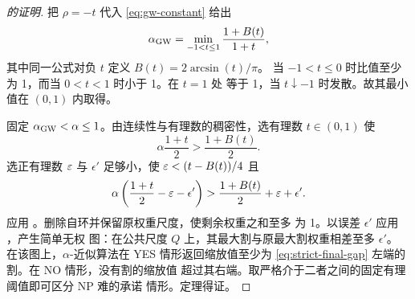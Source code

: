 \begin{proof}[ 的证明]
把 $\rho=-t$ 代入 \eqref{eq:gw-constant} 给出
\begin{equation}\label{eq:gw-ratio}
 \alpha_{\mathrm{GW}}=\min_{-1<t\le1}\frac{1+B(t)}{1+t},
\end{equation}
其中同一公式对负 $t$ 定义 $B(t)=2\arcsin(t)/\pi$。
当 $-1<t\le0$ 时比值至少为 1，而当 $0<t<1$ 时小于 1。在 $t=1$ 处
等于 1，当 $t\downarrow-1$ 时发散。故其最小值在 $(0,1)$ 内取得。

固定 $\alpha_{\mathrm{GW}}<\alpha\le1$。由连续性与有理数的稠密性，选有理数
$t\in(0,1)$ 使
\[
 \alpha\frac{1+t}{2}>\frac{1+B(t)}{2}.
\]
选正有理数 $\varepsilon$ 与 $\epsilon'$ 足够小，使 $\varepsilon<(t-B(t))/4$ 且
\begin{equation}\label{eq:strict-final-gap}
 \alpha\left(\frac{1+t}{2}-\varepsilon-\epsilon'\right)
 >\frac{1+B(t)}{2}+\varepsilon+\epsilon'.
\end{equation}
应用 。删除自环并保留原权重尺度，使剩余权重之和至多
为 1。以误差 $\epsilon'$ 应用 ，产生简单无权
图：在公共尺度 $Q$ 上，其最大割与原最大割权重相差至多 $\epsilon'$。
在该图上，$\alpha$-近似算法在 YES 情形返回缩放值至少为
\eqref{eq:strict-final-gap} 左端的割。在 NO 情形，没有割的缩放值
超过其右端。取严格介于二者之间的固定有理阈值即可区分 NP 难的承诺
情形。定理得证。
\end{proof}
